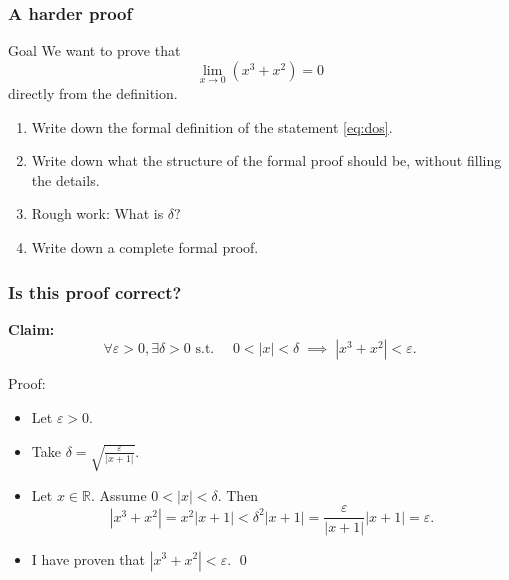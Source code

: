 \documentclass[14pt]{beamer}
\begin{document}

	\begin{frame}
		\frametitle{A harder proof}

		\begin{block}{Goal}
			We want to prove that
			\begin{equation}
				\label{eq:dos}\lim_{x \to 0}\left( x^{3}+ x^{2}\right) = 0
			\end{equation}
			directly from the definition.
		\end{block}
		\vfill
		\begin{enumerate}

			\item Write down the formal definition of the statement \eqref{eq:dos}.

			\item Write down what the structure of the formal proof should be, without
				filling the details.

			\item Rough work: What is $\delta?$

			\item Write down a complete formal proof.
		\end{enumerate}
		\vfill
	\end{frame}

	\begin{frame}[t]
		\frametitle{Is this proof correct?}

		{\bfseries Claim:}
		\[
			\forall \varepsilon >0, \exists \delta>0 \text{ s.t. }\quad 0<|x|<\delta \;
			\implies \; |x^{3}+x^{2}| < \varepsilon.
		\]
		\vfill
		\begin{block}{Proof:}
			\begin{itemize}
				\item Let $\varepsilon >0$.

				\item Take $\displaystyle \delta = \sqrt{\frac{\varepsilon}{|x+1|}}$.

				\item Let $x \in \mathbb{R}$. Assume $0 < |x| < \delta$. Then
					\[
						|x^{3}+x^{2}| = x^{2}| x + 1| < \delta^{2}|x+1| = \frac{\varepsilon}{|x+1|}
						|x+1| = \varepsilon.
					\]

				\item I have proven that $\displaystyle |x^{3}+x^{2}| < \varepsilon$.
					\hfill \qed
			\end{itemize}
		\end{block}

		\vfill
	\end{frame}
\end{document}
